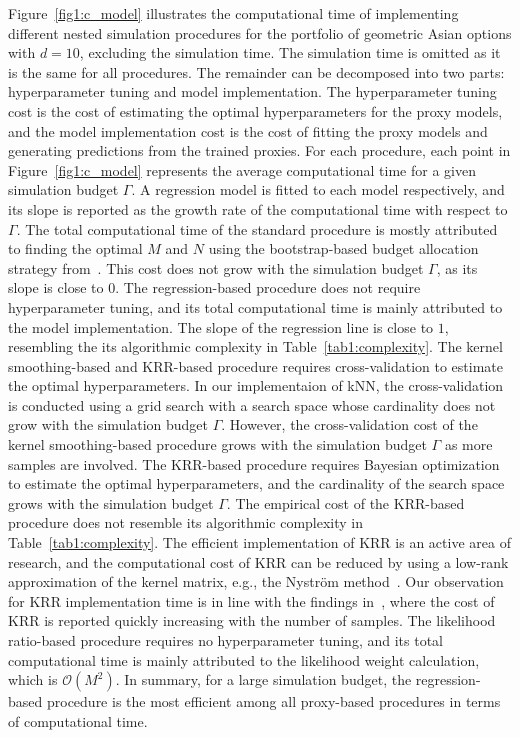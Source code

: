 Figure~\ref{fig1:c_model} illustrates the computational time of implementing different nested simulation procedures for the portfolio of geometric Asian options with $d = 10$, excluding the simulation time.
The simulation time is omitted as it is the same for all procedures.
The remainder can be decomposed into two parts: hyperparameter tuning and model implementation.
The hyperparameter tuning cost is the cost of estimating the optimal hyperparameters for the proxy models, and the model implementation cost is the cost of fitting the proxy models and generating predictions from the trained proxies.
For each procedure, each point in Figure~\ref{fig1:c_model} represents the average computational time for a given simulation budget $\Gamma$.
A regression model is fitted to each model respectively, and its slope is reported as the growth rate of the computational time with respect to $\Gamma$.
The total computational time of the standard procedure is mostly attributed to finding the optimal $M$ and $N$ using the bootstrap-based budget allocation strategy from~\cite{zhang2021bootstrap}.
This cost does not grow with the simulation budget $\Gamma$, as its slope is close to $0$.
The regression-based procedure does not require hyperparameter tuning, and its total computational time is mainly attributed to the model implementation.
The slope of the regression line is close to $1$, resembling the its algorithmic complexity in Table~\ref{tab1:complexity}.
The kernel smoothing-based and KRR-based procedure requires cross-validation to estimate the optimal hyperparameters.
In our implementaion of kNN, the cross-validation is conducted using a grid search with a search space whose cardinality does not grow with the simulation budget $\Gamma$.
However, the cross-validation cost of the kernel smoothing-based procedure grows with the simulation budget $\Gamma$ as more samples are involved.
The KRR-based procedure requires Bayesian optimization to estimate the optimal hyperparameters, and the cardinality of the search space grows with the simulation budget $\Gamma$.
The empirical cost of the KRR-based procedure does not resemble its algorithmic complexity in Table~\ref{tab1:complexity}.
The efficient implementation of KRR is an active area of research, and the computational cost of KRR can be reduced by using a low-rank approximation of the kernel matrix, e.g., the Nystr\"om method~\citep{nystrom1930praktische}.
Our observation for KRR implementation time is in line with the findings in~\cite{scikit-learn}, where the cost of KRR is reported quickly increasing with the number of samples.
The likelihood ratio-based procedure requires no hyperparameter tuning, and its total computational time is mainly attributed to the likelihood weight calculation, which is $\mathcal{O}(M^2)$. 
In summary, for a large simulation budget, the regression-based procedure is the most efficient among all proxy-based procedures in terms of computational time.

